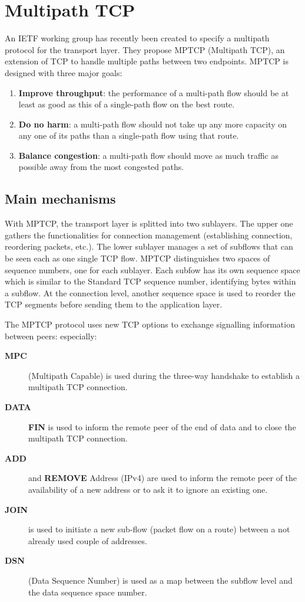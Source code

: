 \documentclass{sig-alternate}
\begin{document}
\section{Multipath TCP}\label{sec:drafts}

An IETF working group has recently been created to specify a multipath protocol for the transport layer. They propose MPTCP \cite{ford10} (Multipath TCP), an extension of TCP to handle multiple paths  between two endpoints. MPTCP is designed with three major goals:
\begin{enumerate}
\item 	{\bf Improve throughput}: the performance of a multi-path flow should be at least as good as this of a single-path flow on the best route.
\item 	{\bf Do no harm}: a multi-path flow should not take up any more capacity on any one of its paths than a single-path flow using that route.
\item 	{\bf Balance congestion}: a multi-path flow should move as much traffic as possible away from the most congested paths.
\end{enumerate}

\subsection{Main mechanisms}

With MPTCP, the transport layer is splitted into two sublayers. The upper one gathers the functionalities for connection management (establishing connection, reordering packets, etc.). The lower sublayer manages a set of subflows that can be seen each as one single TCP flow.
MPTCP distinguishes two spaces of sequence numbers, one for each sublayer. Each subfow has its own sequence space which is similar to the Standard TCP sequence number, identifying bytes within a subflow. At the connection level, another sequence space is used to reorder the TCP segments before sending them to the application layer.

The MPTCP protocol uses new TCP options to exchange signalling information between peers: especially: 
\begin{description}
\item[{\bf MPC}] (Multipath Capable) is used during the three-way handshake to establish a multipath TCP connection.  
\item[{\bf DATA}] {\bf FIN} is used to inform the remote peer of the end of data and to close the multipath TCP connection.
\item[{\bf ADD}] and {\bf REMOVE} Address (IPv4) are used to inform the remote peer of the availability of a new address or to ask it to ignore an existing one.
\item[{\bf JOIN}] is used to initiate a new sub-flow (packet flow on a route) between a not already used couple of addresses.
\item[{\bf DSN}] (Data Sequence Number) is used as a map between the subflow level and the data sequence space number.
\end{description}
\end{document}
